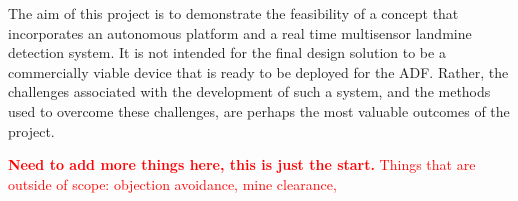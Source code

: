 \documentclass[main.tex]{subfiles}
\begin{document}
The aim of this project is to demonstrate the feasibility of a concept that incorporates an autonomous platform and a real time multisensor landmine detection system. It is not intended for the final design solution to be a commercially viable device that is ready to be deployed for the ADF. Rather, the challenges associated with the development of such a system, and the methods used to overcome these challenges, are perhaps the most valuable outcomes of the project. 

\textcolor{red}{\textbf{Need to add more things here, this is just the start.} Things that are outside of scope: objection avoidance, mine clearance, }
\end{document}
